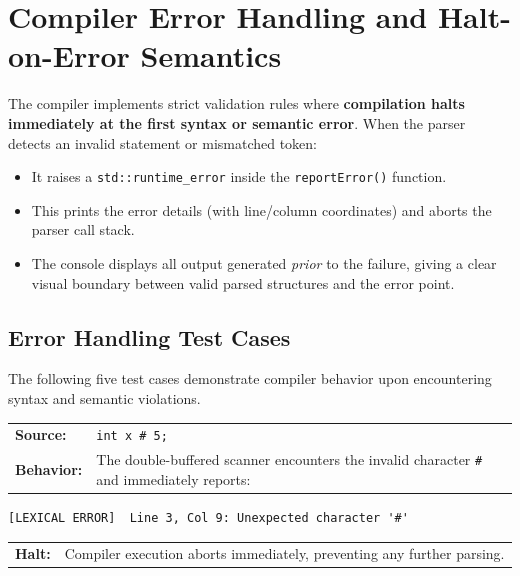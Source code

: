 \documentclass[11pt,a4paper]{article}
\begin{document}
\newpage
\section{Compiler Error Handling and Halt-on-Error Semantics}

The compiler implements strict validation rules where \textbf{compilation halts immediately at the first syntax or semantic error}. When the parser detects an invalid statement or mismatched token:

\begin{itemize}
  \item It raises a \texttt{std::runtime\_error} inside the \texttt{reportError()} function.
  \item This prints the error details (with line/column coordinates) and aborts the parser call stack.
  \item The console displays all output generated \emph{prior} to the failure, giving a clear visual boundary between valid parsed structures and the error point.
\end{itemize}

\subsection{Error Handling Test Cases}

The following five test cases demonstrate compiler behavior upon encountering syntax and semantic violations.

\begin{tcolorbox}[testcase, title={Test Case 1 \quad|\quad Lexical Error — Invalid Symbol}]
\begin{tabular}{@{}L{2.4cm}L{11cm}@{}}
\textbf{Source:}    & \texttt{int x \# 5;} \\[4pt]
\textbf{Behavior:}  & The double-buffered scanner encounters the invalid character \texttt{\#} and immediately reports: \\
\end{tabular}
\medskip
\begin{lstlisting}[style=outputstyle, numbers=none]
[LEXICAL ERROR]  Line 3, Col 9: Unexpected character '#'
\end{lstlisting}
\smallskip
\begin{tabular}{@{}L{2.4cm}L{11cm}@{}}
\textbf{Halt:} & Compiler execution aborts immediately, preventing any further parsing.
\end{tabular}
\end{tcolorbox}
\end{document}
